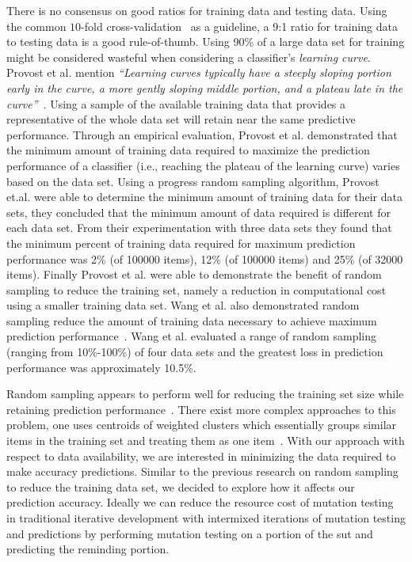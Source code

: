 There is no consensus on good ratios for training data and testing data. Using the common $10$-fold cross-validation~\cite{Koh95} as a guideline, a 9:1 ratio for training data to testing data is a good rule-of-thumb. Using 90\% of a large data set for training might be considered wasteful when considering a classifier's \emph{learning curve}. Provost et al. mention \emph{``Learning curves typically have a steeply sloping portion early in the curve, a more gently sloping middle portion, and a plateau late in the curve''}~\cite{PJO99}. Using a sample of the available training data that provides a representative of the whole data set will retain near the same predictive performance. Through an empirical evaluation, Provost et al. demonstrated that the minimum amount of training data required to maximize the prediction performance of a classifier (i.e., reaching the plateau of the learning curve) varies based on the data set. Using a progress random sampling algorithm, Provost et.al. were able to determine the minimum amount of training data for their data sets, they concluded that the minimum amount of data required is different for each data set. From their experimentation with three data sets they found that the minimum percent of training data required for maximum prediction performance was 2\% (of 100000 items), 12\% (of 100000 items) and 25\% (of 32000 items). Finally Provost et al. were able to demonstrate the benefit of random sampling to reduce the training set, namely a reduction in computational cost using a smaller training data set. Wang et al. also demonstrated random sampling reduce the amount of training data necessary to achieve maximum prediction performance~\cite{WNC05}. Wang et al. evaluated a range of random sampling (ranging from 10\%-100\%) of four data sets and the greatest loss in prediction performance was approximately 10.5\%. 

Random sampling appears to perform well for reducing the training set size while retaining prediction performance~\cite{PJO99, WNC05}. There exist more complex approaches to this problem, one uses centroids of weighted clusters which essentially groups similar items in the training set and treating them as one item~\cite{NBP08}. With our approach with respect to data availability, we are interested in minimizing the data required to make accuracy predictions. Similar to the previous research on random sampling to reduce the training data set, we decided to explore how it affects our prediction accuracy. Ideally we can reduce the resource cost of mutation testing in traditional iterative development with intermixed iterations of mutation testing and predictions by performing mutation testing on a portion of the \gls{sut} and predicting the reminding portion. 

